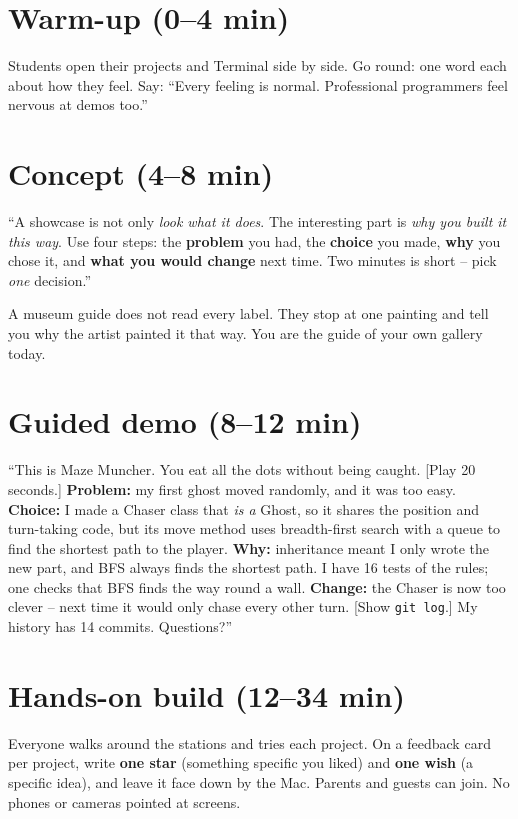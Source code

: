 \section{Warm-up (0--4 min)}
Students open their projects and Terminal side by side. Go round: one word each about how they feel. Say: \enquote{Every feeling is normal. Professional programmers feel nervous at demos too.}

\section{Concept (4--8 min)}
\begin{teacherscript}
\enquote{A showcase is not only \emph{look what it does}. The interesting part is \emph{why you built it this way}. Use four steps: the \textbf{problem} you had, the \textbf{choice} you made, \textbf{why} you chose it, and \textbf{what you would change} next time. Two minutes is short -- pick \emph{one} decision.}
\end{teacherscript}

\begin{analogy}
A museum guide does not read every label. They stop at one painting and tell you why the artist painted it that way. You are the guide of your own gallery today.
\end{analogy}

\section{Guided demo (8--12 min)}
\begin{workedexample}
\enquote{This is Maze Muncher. You eat all the dots without being caught. [Play 20 seconds.] \textbf{Problem:} my first ghost moved randomly, and it was too easy. \textbf{Choice:} I made a Chaser class that \emph{is a} Ghost, so it shares the position and turn-taking code, but its move method uses breadth-first search with a queue to find the shortest path to the player. \textbf{Why:} inheritance meant I only wrote the new part, and BFS always finds the shortest path. I have 16 tests of the rules; one checks that BFS finds the way round a wall. \textbf{Change:} the Chaser is now too clever -- next time it would only chase every other turn. [Show \texttt{git log}.] My history has 14 commits. Questions?}
\end{workedexample}

\section{Hands-on build (12--34 min)}
\begin{unplugged}
Everyone walks around the stations and tries each project. On a feedback card per project, write \textbf{one star} (something specific you liked) and \textbf{one wish} (a specific idea), and leave it face down by the Mac. Parents and guests can join. No phones or cameras pointed at screens.
\end{unplugged}

